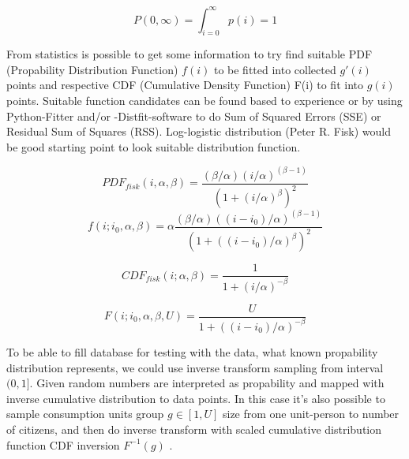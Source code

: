 \begin{equation} \label{eq:propability_overall_infty}
	P(0,\infty)=\int_{i=0}^{\infty} p(i)=1
\end{equation}


From statistics is possible to get some information to try find suitable
PDF (Propability Distribution Function) $f(i)$ to be fitted into collected $g'(i)$
points and respective CDF (Cumulative Density Function) F(i) to fit into $g(i)$ points.
Suitable function candidates can be found based to experience or by using Python-Fitter
and/or -Distfit-software to do Sum of Squared Errors (SSE) or Residual Sum of Squa\-res (RSS).
Log-logistic distribution\cite{LogLogisticDistribution} (Peter R. Fisk\cite{Fisk})
would be good starting point to look suitable distribution function.

\begin{equation} \label{eq:PDFfisk}
 PDF_{fisk}(i,\alpha,\beta)=\frac{(\beta/\alpha)(i/\alpha)^{(\beta-1)}}{(1+(i/\alpha)^\beta)^2}
\end{equation}
\begin{equation} \label{eq:PDFf}
 f(i;i_0,\alpha,\beta)=
 \alpha\frac{(\beta/\alpha)((i-i_0)/\alpha)^{(\beta-1)}}{(1+((i-i_0)/\alpha)^\beta)^2}
\end{equation}

\begin{equation} \label{eq:CDFfisk}
 CDF_{fisk}(i;\alpha,\beta)
 =\frac{1}{1+(i/\alpha)^{-\beta}}
\end{equation}

\begin{equation} \label{eq:CDFF}
 F(i;i_0,\alpha,\beta,U)
 =\frac{U}{1+((i-i_0)/\alpha)^{-\beta}}
\end{equation}

To be able to fill database for testing with the data, what known propability
distribution represents, we could use inverse transform sampling from interval
$(0,1]$. Given random numbers are interpreted as propability and mapped with
inverse cumulative distribution to data points\cite{InvTransformSampling}.
In this case it's also possible to sample consumption units group $g \in [1,U]$
size from one unit-person to number of citizens, and then do inverse transform
with scaled cumulative distribution function CDF inversion $F^{-1}(g)$ .


